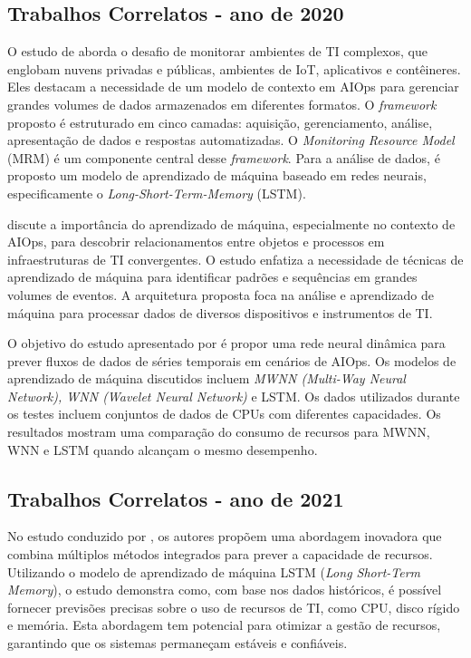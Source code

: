 \subsection{Trabalhos Correlatos - ano de 2020}\label{trab_correlatos_20}

O estudo de \cite{9156101} aborda o desafio de monitorar ambientes de TI complexos, que englobam nuvens privadas e públicas, ambientes de IoT, aplicativos e contêineres. Eles destacam a necessidade de um modelo de contexto em AIOps para gerenciar grandes volumes de dados armazenados em diferentes formatos. O \textit{framework} proposto é estruturado em cinco camadas: aquisição, gerenciamento, análise, apresentação de dados e respostas automatizadas. O \textit{Monitoring Resource Model} (MRM) é um componente central desse \textit{framework}. Para a análise de dados, é proposto um modelo de aprendizado de máquina baseado em redes neurais, especificamente o \textit{Long-Short-Term-Memory} (LSTM).

\cite{9311349} discute a importância do aprendizado de máquina, especialmente no contexto de AIOps, para descobrir relacionamentos entre objetos e processos em infraestruturas de TI convergentes. O estudo enfatiza a necessidade de técnicas de aprendizado de máquina para identificar padrões e sequências em grandes volumes de eventos. A arquitetura proposta foca na análise e aprendizado de máquina para processar dados de diversos dispositivos e instrumentos de TI.

O objetivo do estudo apresentado por \cite{9443765} é propor uma rede neural dinâmica para prever fluxos de dados de séries temporais em cenários de AIOps. Os modelos de aprendizado de máquina discutidos incluem \textit{MWNN (Multi-Way Neural Network), WNN (Wavelet Neural Network)} e LSTM. Os dados utilizados durante os testes incluem conjuntos de dados de CPUs com diferentes capacidades. Os resultados mostram uma comparação do consumo de recursos para MWNN, WNN e LSTM quando alcançam o mesmo desempenho.



\subsection{Trabalhos Correlatos - ano de 2021}\label{trab_correlatos_21}

No estudo conduzido por \cite{9516546}, os autores propõem uma abordagem inovadora que combina múltiplos métodos integrados para prever a capacidade de recursos. Utilizando o modelo de aprendizado de máquina LSTM (\textit{Long Short-Term Memory}), o estudo demonstra como, com base nos dados históricos, é possível fornecer previsões precisas sobre o uso de recursos de TI, como CPU, disco rígido e memória. Esta abordagem tem potencial para otimizar a gestão de recursos, garantindo que os sistemas permaneçam estáveis e confiáveis.

